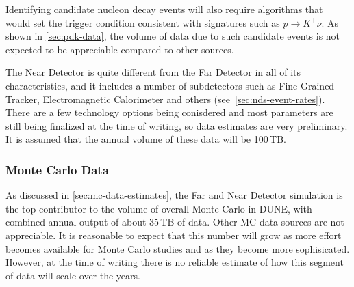 Identifying candidate nucleon decay events will also require algorithms that would set the trigger condition consistent
with signatures such as $p \rightarrow K^+\nu$. As shown in \ref{sec:pdk-data}, the volume of data due to such candidate
events is not expected to be appreciable compared to other sources.

The Near Detector is quite different from the Far Detector in all of its characteristics, and it includes a number of subdetectors
such as Fine-Grained Tracker, Electromagnetic Calorimeter and others (see~\ref{sec:nds-event-rates}). There are a few technology
options being conisdered and most parameters are still being finalized at the time of writing, so data estimates are very preliminary.
It is
assumed that the annual volume of these data will be 100\,TB.



\subsubsection{Monte Carlo Data}
As discussed in \ref{sec:mc-data-estimates}, the Far and Near Detector simulation is the top contributor to the volume of overall
Monte Carlo in DUNE, with combined annual output of about 35\,TB of data. Other MC data sources are not appreciable.
It is reasonable to expect that this number will grow as more effort becomes available for Monte Carlo studies and
as they become more sophisicated. However, at the time of writing there is no reliable estimate of how this segment of data
will scale over the years.


